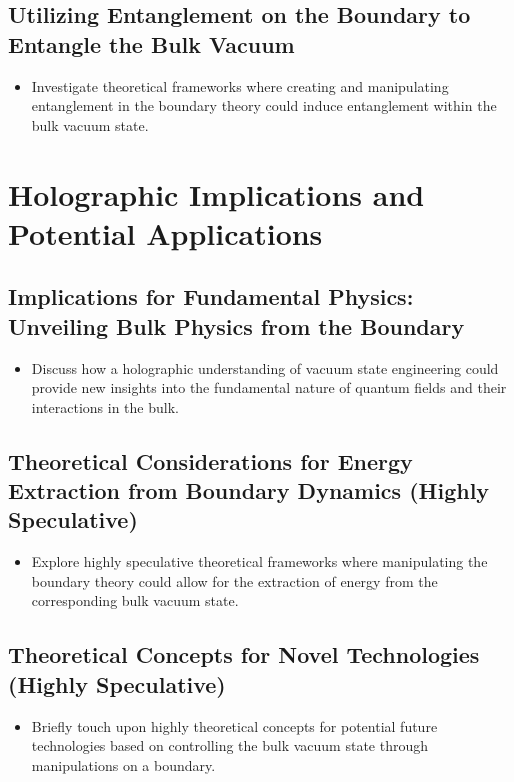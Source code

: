 \documentclass{amsart}
\begin{document}
\subsection{Utilizing Entanglement on the Boundary to Entangle the Bulk Vacuum}
\begin{itemize}
    \item Investigate theoretical frameworks where creating and manipulating entanglement in the boundary theory could induce entanglement within the bulk vacuum state.
\end{itemize}

\section{Holographic Implications and Potential Applications}

\subsection{Implications for Fundamental Physics: Unveiling Bulk Physics from the Boundary}
\begin{itemize}
    \item Discuss how a holographic understanding of vacuum state engineering could provide new insights into the fundamental nature of quantum fields and their interactions in the bulk.
\end{itemize}

\subsection{Theoretical Considerations for Energy Extraction from Boundary Dynamics (Highly Speculative)}
\begin{itemize}
    \item Explore highly speculative theoretical frameworks where manipulating the boundary theory could allow for the extraction of energy from the corresponding bulk vacuum state.
\end{itemize}

\subsection{Theoretical Concepts for Novel Technologies (Highly Speculative)}
\begin{itemize}
    \item Briefly touch upon highly theoretical concepts for potential future technologies based on controlling the bulk vacuum state through manipulations on a boundary.
\end{itemize}
\end{document}
